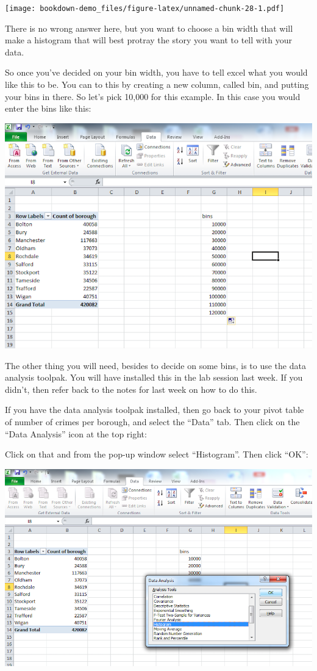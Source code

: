 \documentclass[]{book}
\theoremstyle{definition}
\theoremstyle{definition}
\theoremstyle{definition}
\theoremstyle{remark}
\begin{document}
\texttt{[image: bookdown-demo\_files/figure-latex/unnamed-chunk-28-1.pdf]}

There is no wrong answer here, but you want to choose a bin width that
will make a histogram that will best protray the story you want to tell
with your data.

So once you've decided on your bin width, you have to tell excel what
you would like this to be. You can to this by creating a new column,
called bin, and putting your bins in there. So let's pick 10,000 for
this example. In this case you would enter the bins like this:

\includegraphics{imgs/bin_col.png}

The other thing you will need, besides to decide on some bins, is to use
the data analysis toolpak. You will have installed this in the lab
session last week. If you didn't, then refer back to the notes for last
week on how to do this.

If you have the data analysis toolpak installed, then go back to your
pivot table of number of crimes per borough, and select the ``Data''
tab. Then click on the ``Data Analysis'' icon at the top right:

\href{imgs/dat_loc.png}{}

Click on that and from the pop-up window select ``Histogram''. Then
click ``OK'':

\includegraphics{imgs/dat_pick_hist.png}
\end{document}
